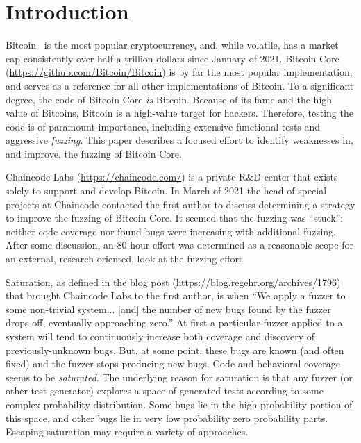 \section{Introduction}

Bitcoin~\cite{nakamoto2008bitcoin} is the most popular cryptocurrency, and, while volatile, has a market cap consistently over half a trillion dollars since January of 2021.   Bitcoin Core (\url{https://github.com/Bitcoin/Bitcoin}) is by far the most popular implementation, and serves as a reference for all other implementations of Bitcoin.  To a significant degree, the code of Bitcoin Core \emph{is} Bitcoin.  Because of its fame and the high value of Bitcoins, Bitcoin is a high-value target for hackers.  Therefore, testing the code is of paramount importance, including extensive functional tests and aggressive \emph{fuzzing}.  This paper describes a focused effort to identify weaknesses in, and improve, the fuzzing of Bitcoin Core.


Chaincode Labs (\url{https://chaincode.com/}) is a private R\&D center that exists solely to support and develop Bitcoin.  In March of 2021 the head of special projects at Chaincode contacted the first author to discuss determining a strategy to improve the fuzzing of Bitcoin Core.  It seemed that the fuzzing was ``stuck'': neither code coverage nor found bugs were increasing with additional fuzzing.  After some discussion, an 80 hour effort was determined as a reasonable scope for an external, research-oriented, look at the fuzzing effort.


Saturation, as defined in the blog post (\url{https://blog.regehr.org/archives/1796}) that brought Chaincode Labs to the first author, is when ``We apply a fuzzer to some non-trivial system... [and] the number of new bugs found by the fuzzer drops off, eventually approaching zero.''  At first a particular fuzzer applied to a system will tend to continuously increase both coverage and discovery of previously-unknown bugs.  But, at some point, these bugs are known (and often fixed) and the fuzzer stops producing new bugs.  Code and behavioral coverage seems to be \emph{saturated}.
The underlying reason for saturation is that any fuzzer (or other test generator) explores a space of generated tests according to some complex probability distribution.  Some bugs lie in the high-probability portion of this space, and other bugs lie in very low probability zero probability parts.  Escaping saturation may require a variety of approaches.

